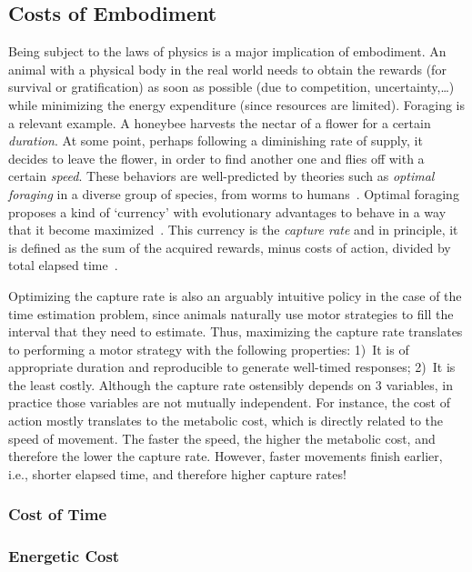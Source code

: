 \subsection{Costs of Embodiment}
\label{ch:intro:cost}
Being subject to the laws of physics is a major implication of embodiment.
An animal with a physical body in the real world needs to obtain the rewards (for survival or gratification) as soon as possible (due to competition, uncertainty,\ldots) while minimizing the energy expenditure (since resources are limited).
Foraging is a relevant example.
A honeybee harvests the nectar of a flower for a certain \textit{duration}.
At some point, perhaps following a diminishing rate of supply, it decides to leave the flower, in order to find another one and flies off with a certain \textit{speed}.
These behaviors are well-predicted by theories such as \emph{optimal foraging} in a diverse group of species, from worms to humans~\cite{Yoon2018PNAS}.
Optimal foraging proposes a kind of `currency' with evolutionary advantages to behave in a way that it become maximized~\cite{Shadmehr2019TINS,Carland2019NeuroSci}.
This currency is the \emph{capture rate} and in principle, it is defined as the sum of the acquired rewards\footnotemark, minus costs of action, divided by total elapsed time~\cite{Shadmehr2019TINS}.
\par
Optimizing the capture rate is also an arguably intuitive policy in the case of the time estimation problem, since animals naturally use motor strategies to fill the interval that they need to estimate.
Thus, maximizing the capture rate translates to performing a motor strategy with the following properties:
    1)~It is of appropriate duration and reproducible to generate well-timed responses;
    2)~It is the least costly.
Although the capture rate ostensibly depends on 3 variables, in practice those variables are not mutually independent.
For instance, the cost of action mostly translates to the metabolic cost, which is directly related to the speed of movement.
The faster the speed, the higher the metabolic cost, and therefore the lower the capture rate.
However, faster movements finish earlier, i.e., shorter elapsed time, and therefore higher capture rates!

\subsubsection{Cost of Time}


\subsubsection{Energetic Cost}